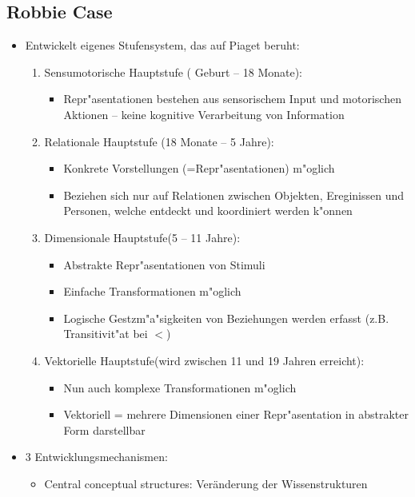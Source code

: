 \subsection{Robbie Case}
\begin{itemize}
	\item
		Entwickelt eigenes Stufensystem, das auf Piaget beruht:
		\begin{enumerate}
			\item
				Sensumotorische Hauptstufe ( Geburt -- 18 Monate):
				\begin{itemize}
					\item
						Repr"asentationen bestehen aus sensorischem Input und motorischen Aktionen -- keine kognitive Verarbeitung von Information
				\end{itemize}
			\item
				Relationale Hauptstufe (18 Monate -- 5 Jahre):
				\begin{itemize}
					\item
						Konkrete Vorstellungen (=Repr"asentationen) m"oglich
					\item
						Beziehen sich nur auf Relationen zwischen Objekten, Ereginissen und Personen, welche entdeckt und koordiniert werden k"onnen
				\end{itemize}
			\item
				Dimensionale Hauptstufe(5 -- 11 Jahre):
				\begin{itemize}
					\item
						Abstrakte Repr"asentationen von Stimuli
					\item
						Einfache Transformationen m"oglich
					\item
						Logische Gestzm"a"sigkeiten von Beziehungen werden erfasst (z.B. Transitivit"at bei $<$)
				\end{itemize}
			\item
				Vektorielle Hauptstufe(wird zwischen 11 und 19 Jahren erreicht):
				\begin{itemize}
					\item
						Nun auch komplexe Transformationen m"oglich
					\item
						Vektoriell = mehrere Dimensionen einer Repr"asentation in abstrakter Form darstellbar
				\end{itemize}
		\end{enumerate}
	\item
		3 Entwicklungsmechanismen:
		\begin{itemize}
			\item
				Central conceptual structures: Veränderung der Wissenstrukturen

\end{itemize}
\end{itemize}
